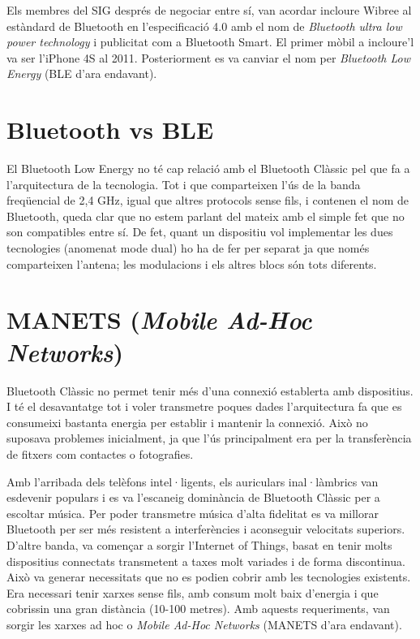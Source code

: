 Els membres del SIG després de negociar entre sí, van acordar incloure Wibree al estàndard de Bluetooth en l'especificació 4.0 amb el nom de \textit{Bluetooth ultra low power technology} i publicitat com a Bluetooth Smart. El primer mòbil a incloure'l va ser l'iPhone 4S al 2011.
Posteriorment es va canviar el nom per \textit{Bluetooth Low Energy} (BLE d'ara endavant).

\section{Bluetooth vs BLE}
El Bluetooth Low Energy no té cap relació amb el Bluetooth Clàssic pel que fa a l'arquitectura de la tecnologia.
Tot i que comparteixen l'ús de la banda freqüencial de 2,4 GHz, igual que altres protocols sense fils, i contenen el nom de Bluetooth, queda clar que no estem parlant del mateix amb el simple fet que no son compatibles entre sí.
De fet, quant un dispositiu vol implementar les dues tecnologies (anomenat mode dual) ho ha de fer per separat ja que només comparteixen l'antena; les modulacions i els altres blocs són tots diferents.

\section{MANETS (\textit{Mobile Ad-Hoc Networks})}
Bluetooth Clàssic no permet tenir més d'una connexió establerta amb dispositius.
I té el desavantatge tot i voler transmetre poques dades l'arquitectura fa que es consumeixi bastanta energia per establir i mantenir la connexió.
Això no suposava problemes inicialment, ja que l'ús principalment era per la transferència de fitxers com contactes o fotografies.

Amb l'arribada dels telèfons intel·ligents, els auriculars inal·làmbrics van esdevenir populars i es va l'escaneig dominància de Bluetooth Clàssic per a escoltar música.
Per poder transmetre música d'alta fidelitat es va millorar Bluetooth per ser més resistent a interferències i aconseguir velocitats superiors.
D'altre banda, va començar a sorgir l'Internet of Things, basat en tenir molts dispositius connectats transmetent a taxes molt variades i de forma discontinua.
Això va generar necessitats que no es podien cobrir amb les tecnologies existents.
Era necessari tenir xarxes sense fils, amb consum molt baix d'energia i que cobrissin una gran distància (10-100 metres).
Amb aquests requeriments, van sorgir les xarxes ad hoc o \textit{Mobile Ad-Hoc Networks} (MANETS d'ara endavant).

